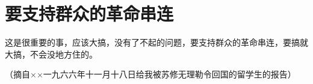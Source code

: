 \section[要支持群众的革命串连（一九六六年十一月）]{要支持群众的革命串连}


这是很重要的事，应该大搞，没有了不起的问题，要支持群众的革命串连，要搞就大搞，不会没地方住的。

{\raggedleft （摘自××一九六六年十一月十八日给我被苏修无理勒令回国的留学生的报告）\par}


